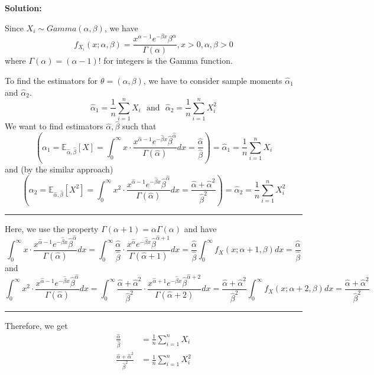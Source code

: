 \documentclass[13pt]{article}
\theoremstyle{definition}
\newenvironment{solution}
{\color{C2}\begin{framed}\begingroup\textbf{Solution:} }
  {\endgroup\end{framed}}
\theoremstyle{remark}
\newcommand{\EE}{\mathbb{E}}
\begin{document}
\begin{solution}

Since $X_i\sim Gamma(\alpha, \beta)$, we have
\[
f_{X_i}(x; \alpha, \beta) = \frac{x^{\alpha-1}e^{-\beta x}\beta^\alpha}{\Gamma(\alpha)}, x>0, \alpha, \beta>0
\]
where $\Gamma(\alpha)=(\alpha-1)!$ for integers is the Gamma function.

To find the estimators for $\theta = (\alpha, \beta)$, we have to consider sample moments $\hat{\alpha}_1$ and $\hat{\alpha}_2$.
\[
\hat{\alpha}_1 = \frac{1}{n}\sum_{i=1}^n X_i \ \ \ \text{and} \ \ \ \hat{\alpha}_2 = \frac{1}{n}\sum_{i=1}^n X_i^2
\]
We want to find estimators $\hat{\alpha}, \hat{\beta}$ such that
\[
\left(\alpha_1 = \EE_{\hat{\alpha}, \hat{\beta}}[X]  = \int_0^{\infty} x\cdot \frac{x^{\hat{\alpha}-1}e^{-\hat{\beta}x}\hat{\beta}^{\hat{\alpha}}}{\Gamma(\hat{\alpha})} dx = \frac{\hat{\alpha}}{\hat{\beta}}\right) = \hat{\alpha}_1 = \frac{1}{n}\sum_{i=1}^n X_i
\]
and (by the similar approach)
\[
\left(\alpha_2 = \EE_{\hat{\alpha}, \hat{\beta}}[X^2]  = \int_0^{\infty} x^2\cdot \frac{x^{\hat{\alpha}-1}e^{-\hat{\beta}x}\hat{\beta}^{\hat{\alpha}}}{\Gamma(\hat{\alpha})} dx = \frac{\hat{\alpha}+\hat{\alpha}^2}{\hat{\beta}^2}\right) = \hat{\alpha}_2 = \frac{1}{n}\sum_{i=1}^n X_i^2
\]

\hrule

Here, we use the property $\Gamma(\alpha+1)= \alpha \Gamma(\alpha)$ and have
\[
\int_0^{\infty} x\cdot \frac{x^{\hat{\alpha}-1}e^{-\hat{\beta}x}\hat{\beta}^{\hat{\alpha}}}{\Gamma(\hat{\alpha})} dx= \int_0^{\infty} \frac{\hat{\alpha}}{\hat{\beta}}\cdot \frac{x^{\hat{\alpha}}e^{-\hat{\beta}x}\hat{\beta}^{\hat{\alpha}+1}}{\Gamma(\hat{\alpha}+1)} dx = \frac{\hat{\alpha}}{\hat{\beta}}\int_0^{\infty} f_X(x; \alpha+1, \beta) dx = \frac{\hat{\alpha}}{\hat{\beta}}
\]
and
\[
\int_0^{\infty} x^2\cdot \frac{x^{\hat{\alpha}-1}e^{-\hat{\beta}x}\hat{\beta}^{\hat{\alpha}}}{\Gamma(\hat{\alpha})} dx= \int_0^{\infty} \frac{\hat{\alpha}+\hat{\alpha}^2}{\hat{\beta}^2}\cdot \frac{x^{\hat{\alpha}+1}e^{-\hat{\beta}x}\hat{\beta}^{\hat{\alpha}+2}}{\Gamma(\hat{\alpha}+2)} dx = \frac{\hat{\alpha}+\hat{\alpha}^2}{\hat{\beta}^2}\int_0^{\infty} f_X(x; \alpha+2, \beta) dx = \frac{\hat{\alpha}+\hat{\alpha}^2}{\hat{\beta}^2}
\]
\hrule
Therefore, we get
\begin{align}
    \frac{\hat{\alpha}}{\hat{\beta}}  &= \frac{1}{n}\sum_{i=1}^n X_i\\
    \frac{\hat{\alpha}+\hat{\alpha}^2}{\hat{\beta}^2}  &= \frac{1}{n}\sum_{i=1}^n X_i^2
\end{align}


\end{solution}
\end{document}
